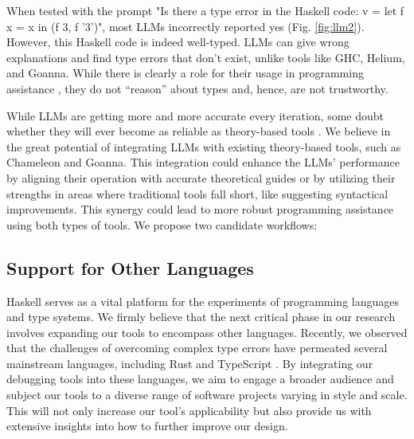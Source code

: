 When tested with the prompt "Is there a type error in the Haskell code: v = let f x = x in (f 3, f '3')", most LLMs incorrectly reported yes (Fig. \ref{fig:llm2}). However, this Haskell code is indeed well-typed. LLMs can give wrong explanations and find type errors that don't exist, unlike tools like GHC, Helium, and Goanna. While there is clearly a role for their usage in programming assistance \cite{Lee2024-hs}, they do not “reason” about types and, hence, are not trustworthy.

While LLMs are getting more and more accurate every iteration, some doubt whether they will ever become as reliable as theory-based tools \cite{Berglund2023-ig}. We believe in the great potential of integrating LLMs with existing theory-based tools, such as Chameleon and Goanna. This integration could enhance the LLMs' performance by aligning their operation with accurate theoretical guides or by utilizing their strengths in areas where traditional tools fall short, like suggesting syntactical improvements. This synergy could lead to more robust programming assistance using both types of tools. We propose two candidate workflows:


\subsection{Support for Other Languages}
Haskell serves as a vital platform for the experiments of programming languages and type systems. We firmly believe that the next critical phase in our research involves expanding our tools to encompass other languages. Recently, we observed that the challenges of overcoming complex type errors have permeated several mainstream languages, including Rust \cite{Zeng2019-ou} and TypeScript \cite{Scarsbrook2023-uq}. By integrating our debugging tools into these languages, we aim to engage a broader audience and subject our tools to a diverse range of software projects varying in style and scale. This will not only increase our tool's applicability but also provide us with extensive insights into how to further improve our design.

